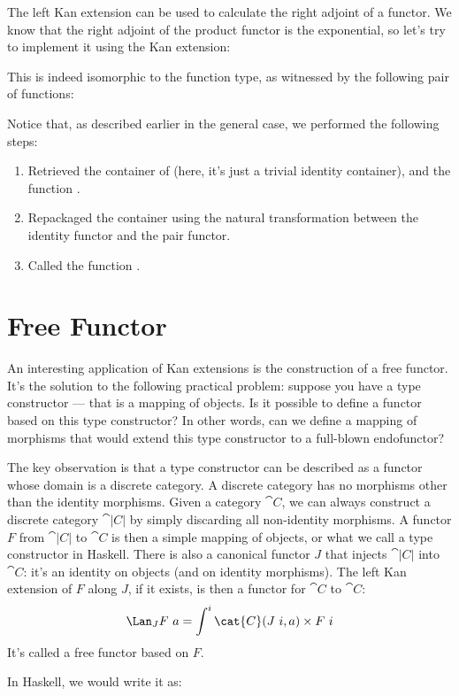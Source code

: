 The left Kan extension can be used to calculate the right adjoint of a
functor. We know that the right adjoint of the product functor is the
exponential, so let's try to implement it using the Kan extension:

This is indeed isomorphic to the function type, as witnessed by the
following pair of functions:

Notice that, as described earlier in the general case, we performed the
following steps:

\begin{enumerate}
\tightlist
\item
Retrieved the container of  (here, it's
just a trivial identity container), and the function .
\item
Repackaged the container using the natural transformation between the
identity functor and the pair functor.
\item
Called the function .
\end{enumerate}

\section{Free Functor}

An interesting application of Kan extensions is the construction of a
free functor. It's the solution to the following practical problem:
suppose you have a type constructor --- that is a mapping of objects. Is
it possible to define a functor based on this type constructor? In other
words, can we define a mapping of morphisms that would extend this type
constructor to a full-blown endofunctor?

The key observation is that a type constructor can be described as a
functor whose domain is a discrete category. A discrete category has no
morphisms other than the identity morphisms. Given a category $\cat{C}$,
we can always construct a discrete category $\cat{|C|}$
by simply discarding all non-identity morphisms. A functor $F$
from $\cat{|C|}$ to $\cat{C}$ is then a simple mapping
of objects, or what we call a type constructor in Haskell. There is also
a canonical functor $J$ that injects $\cat{|C|}$
into $\cat{C}$: it's an identity on objects (and on identity morphisms).
The left Kan extension of $F$ along $J$, if it exists, is
then a functor for $\cat{C}$ to $\cat{C}$:
\[\Lan_{J}F\ a = \int^i \cat{C}(J\ i, a)\times{}F\ i\]
It's called a free functor based on $F$.

In Haskell, we would write it as:

